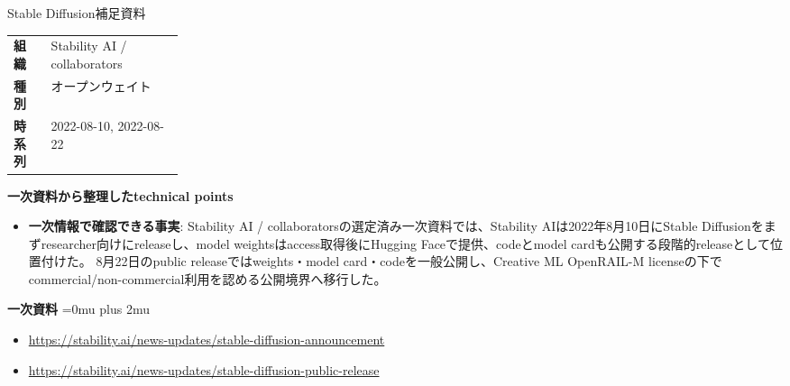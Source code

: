 \begin{technicalnote}{Stable Diffusion}{補足資料}
\begingroup
\begin{tabularx}{\linewidth}{@{}>{\bfseries}p{0.22\linewidth}X@{}}
組織 & Stability AI / collaborators \\
種別 & オープンウェイト \\
時系列 & 2022-08-10, 2022-08-22 \\
\end{tabularx}
\smallskip
{\bfseries 一次資料から整理したtechnical points}
\begin{itemize}[leftmargin=1.5em,itemsep=0.35em]
\item \textbf{一次情報で確認できる事実}: Stability AI / collaboratorsの選定済み一次資料では、Stability AIは2022年8月10日にStable Diffusionをまずresearcher向けにreleaseし、model weightsはaccess取得後にHugging Faceで提供、codeとmodel cardも公開する段階的releaseとして位置付けた。 8月22日のpublic releaseではweights・model card・codeを一般公開し、Creative ML OpenRAIL-M licenseの下でcommercial/non-commercial利用を認める公開境界へ移行した。
\end{itemize}
\begin{minipage}{\linewidth}
\begin{samepage}
{\bfseries 一次資料}
\begingroup\sloppy
\Urlmuskip=0mu plus 2mu\relax
\begin{itemize}[leftmargin=1.5em,itemsep=0.25em]
\item {\scriptsize\url{https://stability.ai/news-updates/stable-diffusion-announcement}}
\item {\scriptsize\url{https://stability.ai/news-updates/stable-diffusion-public-release}}
\end{itemize}
\endgroup
\end{samepage}
\end{minipage}
\endgroup
\end{technicalnote}
\medskip

